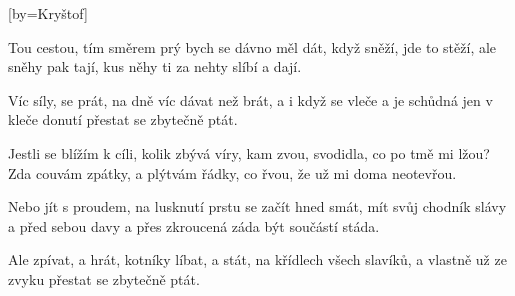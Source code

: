 [by={Kryštof}]

\beginverse*{}
    
\endverse{}

\beginverse{}
Tou cestou, tím směrem prý bych se dávno měl dát,
když sněží, jde to stěží, ale sněhy pak tají,
kus něhy ti za nehty slíbí a dají.
\endverse{}

\beginverse{}
Víc síly, se prát, na dně víc dávat než brát,
a i když se vleče a je schůdná jen v kleče
donutí přestat se zbytečně ptát.
\endverse{}

\beginchorus{}
Jestli se blížím k cíli, kolik zbývá víry,
kam zvou, svodidla, co po tmě mi lžou?
Zda couvám zpátky, a plýtvám řádky, co řvou,
že už mi doma neotevřou. 
\endchorus{}

\beginverse{}
Nebo jít s proudem, na lusknutí prstu se začít hned smát,
mít svůj chodník slávy a před sebou davy
a přes zkroucená záda být součástí stáda.
\endverse{}

\beginverse{}
Ale zpívat, a hrát, kotníky líbat, a stát,
na křídlech všech slavíků, a vlastně už ze zvyku
přestat se zbytečně ptát.
\endverse{}

\beginchorus{}
\phantom{}
\endchorus{}

\endsong{}
